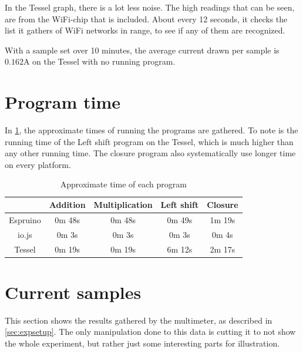 In the Tessel graph, there is a lot less noise.
The high readings that can be seen, are from the WiFi-chip that is included.
About every 12 seconds, it checks the list it gathers of WiFi networks in range, to see if any of them are recognized.

With a sample set over 10 minutes, the average current drawn per sample is $0.162\si{\ampere}$ on the Tessel with no running program.

\section{Program time}
In \cref{tab:timedruns}, the approximate times of running the programs are gathered.
To note is the running time of the Left shift program on the Tessel, which is much higher than any other running time.
The closure program also systematically use longer time on every platform.
\begin{table}[h]
\centering
\begin{tabular}{ c  c  c  c  c }
 & Addition & Multiplication & Left shift & Closure \\ \midrule
 \rowcolor[gray]{.9}
 Espruino &  0m 48s & 0m 48s & 0m 49s & 1m 19s \\ 
 \rowcolor[gray]{.5}
 io.js  & 0m 3s & 0m 3s & 0m 3s & 0m 4s \\ 
 \rowcolor[gray]{.9}
 Tessel & 0m 19s & 0m 19s & 6m 12s & 2m 17s\\ 
 \bottomrule
\end{tabular}
\caption{Approximate time of each program}
\label{tab:timedruns}
\end{table}



\section{Current samples}
This section shows the results gathered by the multimeter, as described in \cref{sec:expsetup}.
The only manipulation done to this data is cutting it to not show the whole experiment, but rather just some interesting parts for illustration.

